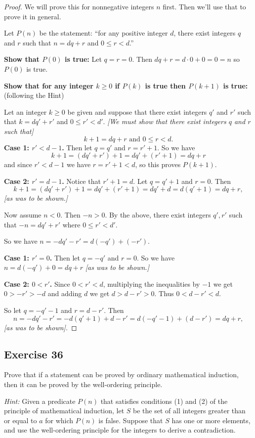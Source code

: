 \documentclass[14pt]{extarticle}
\begin{document}
\begin{proof}
We will prove this for nonnegative integers $n$ first. Then we'll use that to prove it in general.

Let $P(n)$ be the statement: ``for any positive integer $d$, there exist integers $q$ and $r$ such that $n = dq + r$ and $0 \leq r < d$.''

{\bf Show that $P(0)$ is true:} Let $q = r = 0$. Then $dq + r = d \cdot 0 + 0 = 0 = n$ so $P(0)$ is true.

{\bf Show that for any integer $k \geq 0$ if $P(k)$ is true then $P(k+1)$ is true:} (following the Hint)

Let an integer $k \geq 0$ be given and suppose that there exist integers $q'$ and $r'$ such that $k = dq' + r'$ and 
$0 \leq r' < d'.$ {\it [We must show that there exist integers $q$ and $r$ such that]}
\[
k + 1 = dq + r \text{ and } 0 \leq r < d.
\]
{\bf Case 1: $r' < d - 1$.} Then let $q = q'$ and $r = r'+1$. So we have
\[
k+1 = (dq' + r') + 1 = dq' + (r' + 1) = dq + r
\]
and since $r' < d-1$ we have $r = r'+1 < d$, so this proves $P(k+1)$.

{\bf Case 2: $r' = d - 1$.} Notice that $r' + 1 = d$. Let $q = q'+1$ and $r = 0$.  Then
\[
k+1 = (dq'+r') + 1 = dq' + (r'+1) = dq'+d = d(q'+1) = dq + r,
\]
{\it [as was to be shown.]}

Now assume $n < 0$. Then $-n > 0$. By the above, there exist integers $q',r'$ such that $-n = dq' + r'$ where $0 \leq r' < d'$.

So we have $n = -dq' - r' = d(-q') + (-r')$.

{\bf Case 1: $r' = 0$.} Then let $q = -q'$ and $r = 0$. So we have $n = d(-q') + 0 = dq + r$ {\it [as was to be shown.]}

{\bf Case 2: $0 < r'$.}
Since $0 < r' < d$, multiplying the inequalities by
$-1$ we get $0 > -r' > -d$ and adding $d$ we get
$d > d - r' > 0$. Thus $0 < d-r' < d$.

So let $q = -q'-1$ and $r = d-r'$. Then 
\[
n = -dq' - r' = -d(q'+1) + d - r' = d(-q'-1) + (d-r') = dq + r,
\]
{\it [as was to be shown].}
\end{proof}

\subsection{Exercise 36}
Prove that if a statement can be proved by ordinary mathematical induction, then it can be proved by the well-ordering principle.

{\it Hint:} Given a predicate $P(n)$ that satisfies conditions (1) and (2) of the principle of mathematical 
induction, let $S$ be the set of all integers greater than or equal to $a$ for which $P(n)$ is false. Suppose that $S$ 
has one or more elements, and use the well-ordering principle for the integers to derive a contradiction.
\end{document}
